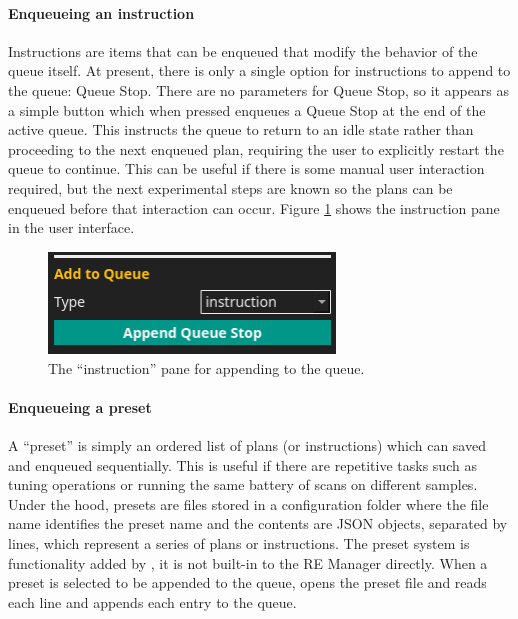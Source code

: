 \paragraph{Enqueueing an instruction}
Instructions are items that can be enqueued that modify the behavior of the queue itself.
At present, there is only a single option for instructions to append to the queue: Queue Stop.
There are no parameters for Queue Stop, so it appears as a simple button which when pressed enqueues a Queue Stop at the end of the active queue.
This instructs the queue to return to an idle state rather than proceeding to the next enqueued plan, requiring the user to explicitly restart the queue to continue.
This can be useful if there is some manual user interaction required, but the next experimental steps are known so the plans can be enqueued before that interaction can occur.
Figure \ref{acq:fig:instruction} shows the instruction pane in the user interface.


\begin{figure}
\includegraphics[width=3in]{"acquisition/images/instruction"}
\caption[Instruction Pane]{
	The ``instruction'' pane for appending to the queue.
}
\label{acq:fig:instruction}
\end{figure}

\paragraph{Enqueueing a preset}

A ``preset'' is simply an ordered list of plans (or instructions) which can saved and enqueued sequentially.
This is useful if there are repetitive tasks such as tuning operations or running the same battery of scans on different samples.
Under the hood, presets are files stored in a configuration folder where the file name identifies the preset name and the contents are JSON objects, separated by lines, which represent a series of plans or instructions.
The preset system is functionality added by \blueskycmds, it is not built-in to the RE Manager directly.
When a preset is selected to be appended to the queue, \blueskycmds opens the preset file and reads each line and appends each entry to the queue.

